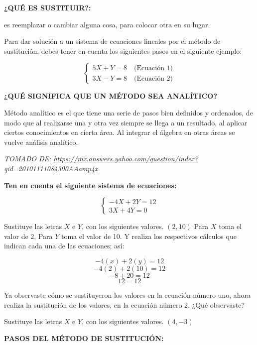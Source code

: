 \documentclass[12pt,a4paper]{article}
\begin{document}
\textbf{¿QUÉ ES SUSTITUIR?:}

es reemplazar o cambiar alguna cosa, para colocar otra en su lugar.

Para dar solución a un sistema de ecuaciones lineales por el método de sustitución, debes tener en cuenta los siguientes pasos en el siguiente ejemplo:

\[ \begin{cases}
5X + Y = 8 \quad \text{(Ecuación 1)} \\
3X - Y = 8 \quad \text{(Ecuación 2)}
\end{cases} \]

\textbf{¿QUÉ SIGNIFICA QUE UN MÉTODO SEA ANALÍTICO?}

Método analítico es el que tiene una serie de pasos bien definidos y ordenados, de modo que al realizarse una y otra vez siempre se llega a un resultado, al aplicar ciertos conocimientos en cierta área. Al integrar el álgebra en otras áreas se vuelve análisis analítico.

\textit{TOMADO DE: \url{https://mx.answers.yahoo.com/question/index?qid=20101111084300AAamp4x}}

\textbf{Ten en cuenta el siguiente sistema de ecuaciones:}

\[ \begin{cases}
-4X + 2Y = 12 \\
3X + 4Y = 0
\end{cases} \]

Sustituye las letras $X$ e $Y$, con los siguientes valores. $(2, 10)$ Para $X$ toma el valor de 2, Para $Y$ toma el valor de 10. Y realiza los respectivos cálculos que indican cada una de las ecuaciones; así:

\[ -4(x) + 2(y) = 12 \]
\[ -4(2) + 2(10) = 12 \]
\[ -8 + 20 = 12 \]
\[ 12 = 12 \]

Ya observaste cómo se sustituyeron los valores en la ecuación número uno, ahora realiza la sustitución de los valores, en la ecuación número 2. ¿Qué observaste?

Sustituye las letras $X$ e $Y$, con los siguientes valores. $(4, -3)$

\vspace{1cm}

\textbf{PASOS DEL MÉTODO DE SUSTITUCIÓN:}
\end{document}
